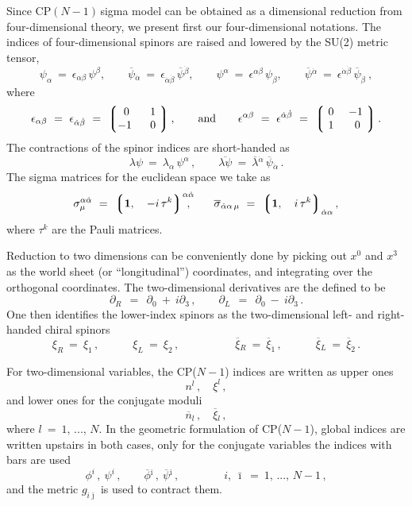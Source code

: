 \documentclass[epsfig,12pt]{article}
\def\beq{\begin{equation}}
\def\eeq{\end{equation}}
\newcommand{\cpn}{CP$(N-1)\,$}
\def\beq{\begin{equation}}
\def\eeq{\end{equation}}
\newcommand{\p}{\partial}
\newcommand{\ov}{\overline}
\newcommand{\lgr}{\left\lgroup}
\newcommand{\rgr}{\right\rgroup}
\newcommand{\bi}{{\bar \imath}}
\newcommand{\bj}{{\bar \jmath}}
\begin{document}
{\setcounter{equation}{0}

Since \cpn sigma model can be obtained as a dimensional reduction from four-dimensional theory,
we present first our four-dimensional notations.
The indices of four-dimensional spinors are raised and lowered by the SU(2) metric tensor,
\beq
	\psi_\alpha ~=~ \epsilon_{\alpha\beta}\, \psi^\beta, \qquad
	\ov{\psi}{}_{\dot{\alpha}} ~=~ \epsilon_{\dot{\alpha}\dot{\beta}}\, \ov{\psi}{}^{\dot\beta}, \qquad 
	\psi^\alpha ~=~ \epsilon^{\alpha\beta}\, \psi_\beta, \qquad
	\ov{\psi}{}^{\dot{\alpha}} ~=~ \epsilon^{\dot\alpha\dot\beta}\, \ov{\psi}{}_{\dot\beta}~,
\eeq
	where
\beq
	\epsilon_{\alpha\beta} ~=~ \epsilon_{\dot\alpha\dot\beta} ~=~
			\lgr \begin{matrix}
			     	\ 0\  &  \ 1\   \\
				 -1\  &  \ 0\  
			     \end{matrix} \rgr,
	\qquad \text{and} \qquad
	\epsilon^{\alpha\beta} ~=~ \epsilon^{\dot\alpha\dot\beta} ~=~
			\lgr \begin{matrix}
				\ 0\ &   -1\   \\
				\ 1\ &  \ 0\ 
			     \end{matrix} \rgr.
\eeq
The contractions of the spinor indices are short-handed as
\beq
	\lambda\psi ~=~ \lambda_\alpha\, \psi^\alpha\,, \qquad
	\ov{\lambda\psi} ~=~  \ov{\lambda}{}^{\dot\alpha}\, \ov{\psi}{}_{\dot\alpha}\,.
\eeq
The sigma matrices for the euclidean space we take as
\beq
	\sigma^{\alpha\dot\alpha}_\mu ~=~  \lgr {\bf 1},\quad -i\,\tau^k \rgr^{\alpha\dot{\alpha}}
	\hspace{-2.0ex},
	\qquad
	\ov{\sigma}{}_{\dot\alpha\alpha\, \mu} ~=~ 
			\lgr {\bf 1},\quad i\, \tau^k \rgr_{\dot\alpha\alpha},
\eeq
where $ \tau^k $ are the Pauli matrices.

Reduction to two dimensions can be conveniently done by picking out $ x^0 $ and $ x^3 $ 
as the world sheet (or ``longitudinal'') coordinates, and integrating over the orthogonal coordinates. 
The two-dimensional derivatives are the defined to be
\beq
	\p_R  ~~=~~ \p_0 ~+~ i\p_3\,, \qquad   \p_L ~~=~~ \p_0 ~-~ i\p_3\,.
\eeq
One then identifies the lower-index spinors as the two-dimensional left- and right-handed chiral spinors
\beq
	\xi_{R} ~=~ \xi_{1}\,, \quad\qquad
	\xi_{L} ~=~ \xi_{2}\,, \quad\qquad\qquad
	\ov{\xi}{}_{R} ~=~ \ov{\xi}{}_{\dot{1}}\,, \quad\qquad
	\ov{\xi}{}_{L} ~=~ \ov{\xi}{}_{\dot{2}}\,.
\eeq

For two-dimensional variables, the CP($N-1$) indices are written as upper ones 
\[
	n^l\,, \quad \xi^l\,,
\]
and lower ones for the conjugate moduli
\[
	\ov{n}{}_l\,, \quad \ov{\xi}{}_l\,, 
\]
where $ l~=~1,\, ...,\, N $.
In the geometric formulation of CP($N-1$), global indices are written upstairs in both cases, only
for the conjugate variables the indices with bars are used 
\[
	\phi^i\,,\ \psi^i\,, \qquad \ov{\phi}{}^\bi\,,\ \ov{\psi}{}^\bi\,, 
	\qquad\qquad i,\ \bi ~=~ 1,\,...,\,N-1\,,
\]
and the metric $ g_{i\bj} $ is used to contract them.

}
\end{document}

